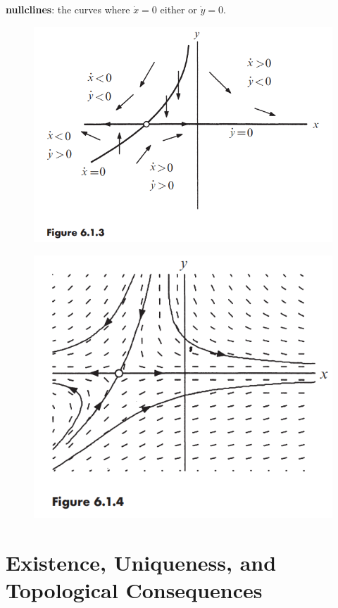 \documentclass[10pt,aspectratio=43,mathserif,table]{beamer}
\begin{document}
\begin{frame}
    \textbf{nullclines}: the curves where $\dot{x} = 0$ either or $\dot{y} = 0$. 

    \begin{figure}
		\centering
		\includegraphics[width=0.7\linewidth]{f613.jpg}
	\end{figure}
\end{frame}

\begin{frame}
    \begin{figure}
		\centering
		\includegraphics[width=0.7\linewidth]{f614.jpg}
	\end{figure}
\end{frame}

\section{Existence, Uniqueness, and Topological Consequences}
\end{document}
